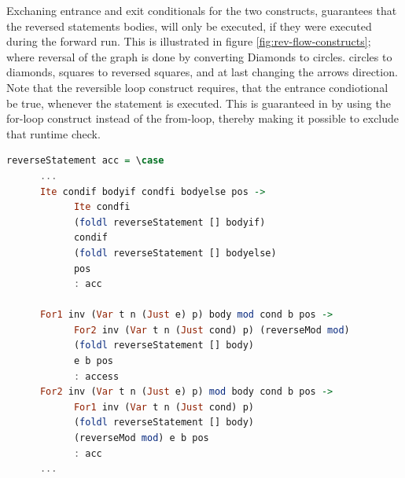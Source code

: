 Exchaning entrance and exit conditionals for the two constructs, guarantees that the reversed
statements bodies, will only be executed, if they were executed during the forward run. This
is illustrated in figure \ref{fig:rev-flow-constructs}; where reversal of the graph is done
by converting Diamonds to circles. circles to diamonds, squares to reversed squares, and at
last changing the arrows direction. Note that the reversible loop construct requires, that
the entrance condiotional be true, whenever the statement is executed. This is guaranteed in
\lan by using the for-loop construct instead of the from-loop, thereby making it possible to
exclude that runtime check.

\begin{lstlisting}[language=Haskell, label={lst:stmt-reverser}, caption={Reversing for-loops and if-statements.}]
reverseStatement acc = \case
      ...
      Ite condif bodyif condfi bodyelse pos ->
            Ite condfi
            (foldl reverseStatement [] bodyif)
            condif
            (foldl reverseStatement [] bodyelse)
            pos
            : acc

      For1 inv (Var t n (Just e) p) body mod cond b pos ->
            For2 inv (Var t n (Just cond) p) (reverseMod mod)
            (foldl reverseStatement [] body)
            e b pos
            : access
      For2 inv (Var t n (Just e) p) mod body cond b pos ->
            For1 inv (Var t n (Just cond) p)
            (foldl reverseStatement [] body)
            (reverseMod mod) e b pos
            : acc
      ...
\end{lstlisting}

